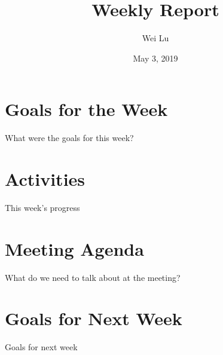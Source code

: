 \documentclass[a4paper]{article}
\title{Weekly Report}
\date{May 3, 2019}
\author{Wei Lu}
\begin{document}
\maketitle

\section{Goals for the Week}

What were the goals for this week?

\section{Activities}

This week's progress

\section{Meeting Agenda}

What do we need to talk about at the meeting?

\section{Goals for Next Week}

Goals for next week

%
%
\end{document}
